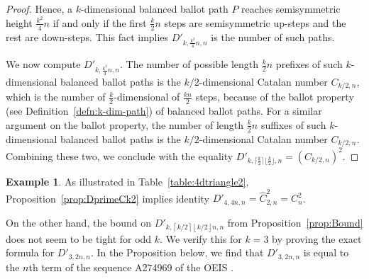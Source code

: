 \documentclass[11pt]{article}
\theoremstyle{remark}
\theoremstyle{definition}
\newtheorem{example}[theorem]{Example}
\begin{document}
\begin{proof}
    Hence, a $k$-dimensional balanced ballot path $P$ reaches semisymmetric height $\frac{k^2}{4}n$ if and only if the first $\frac{k}{2}n$ steps are semisymmetric up-steps and the rest are down-steps. This fact implies $D'_{k, \frac{k^2}{4}n, n}$ is the number of such paths.

    We now compute $D'_{k, \frac{k^2}{4}n, n}$. The number of possible length $\frac{k}{2}n$ prefixes of such $k$-dimensional balanced ballot paths is the $k/2$-dimensional Catalan number $C_{k/2, n}$, which is the number of $\frac{k}{2}$-dimensional of $\frac{kn}{2}$ steps, because of the ballot property (see Definition~\ref{defn:k-dim-path}) of balanced ballot paths. For a similar argument on the ballot property, the number of length $\frac{k}{2}n$ suffixes of such $k$-dimensional balanced ballot paths is the $k/2$-dimensional Catalan number $C_{k/2, n}$. Combining these two, we conclude with the equality $D'_{k,\lceil \frac{k}{2} \rceil \lfloor \frac{k}{2} \rfloor,n} = (C_{k/2,n})^2$.
\end{proof}
\begin{example}
    As illustrated in Table~\ref{table:4dtriangle2}, Proposition~\ref{prop:DprimeCk2} implies identity $D'_{4, 4n, n} = \widehat{C}_{2, n}^2 = C_n^2$.
\end{example}

On the other hand, the bound on $D'_{k, \left\lceil k/2\right\rceil \left\lfloor k/2 \right\rfloor n, n}$ from Proposition~\ref{prop:Bound} does not seem to be tight for odd $k$. We verify this for $k=3$ by proving the exact formula for $D'_{3, 2n, n}$. In the Proposition below, we find that $ D'_{3, 2n, n}$ is equal to the $n$th term of the sequence A274969 of the OEIS \cite{oeis}. 
\end{document}
